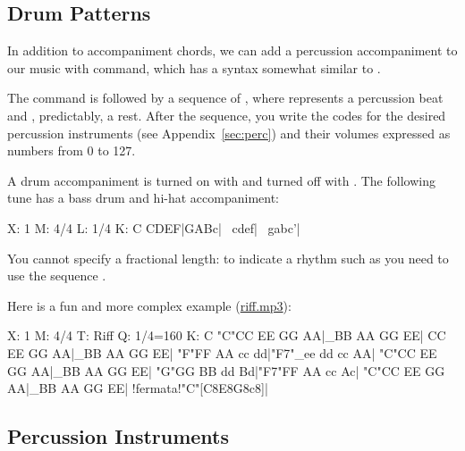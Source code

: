 \documentclass[a4paper,12pt]{book}
\begin{document}
\subsection{Drum Patterns}
\label{sec:rhythm}

In addition to accompaniment chords, we can add a percussion
accompaniment to our music with  command, which has
a syntax somewhat similar to .

The  command is followed by a sequence of ,
where  represents a percussion beat and , predictably, a
rest. After the sequence, you write the codes for the desired
percussion instruments (see Appendix~\ref{sec:perc}) and their volumes
expressed as numbers from 0 to 127.

A drum accompaniment is turned on with  and
turned off with . The following tune has a
bass drum and hi-hat accompaniment:

\begin{abcsource}
X: 1
M: 4/4
L: 1/4
K: C
CDEF|GABc|\
cdef|\
gabc'|
\end{abcsource}

You cannot specify a fractional length: to indicate a rhythm such as
 you need to use the sequence
\cmd{d4d4d4d3d3d3d3}.

Here is a fun and more complex example
(\href{run:riff.mp3}{riff.mp3}):

\begin{abcsource}
X: 1
M: 4/4
T: Riff
Q: 1/4=160
K: C
"C"CC EE GG AA|_BB AA GG EE|
CC EE GG AA|_BB AA GG EE|
"F"FF AA cc dd|"F7"_ee dd cc AA|
"C"CC EE GG AA|_BB AA GG EE|
"G"GG BB dd Bd|"F7"FF AA cc Ac|
"C"CC EE GG AA|_BB AA GG EE|
!fermata!"C"[C8E8G8c8]|
\end{abcsource}


\subsection{Percussion Instruments}
\end{document}
